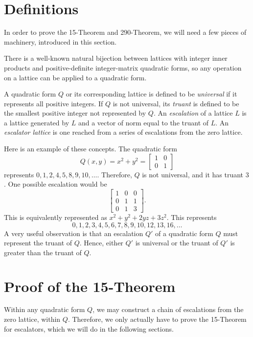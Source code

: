 \documentclass[letterpaper, 12pt]{article}
\begin{document}
\section{Definitions}
In order to prove the 15-Theorem and 290-Theorem, we will need a few pieces of machinery, introduced in this section.

There is a well-known natural bijection between lattices with integer inner products and positive-definite integer-matrix quadratic forms, so any operation on a lattice can be applied to a quadratic form.

A quadratic form $Q$ or its corresponding lattice is defined to be \emph{universal} if it represents all positive integers. If $Q$ is not universal, its \emph{truant} is defined to be the smallest positive integer not represented by $Q$. An \emph{escalation} of a lattice $L$ is a lattice generated by $L$ and a vector of norm equal to the truant of $L$. An \emph{escalator lattice} is one reached from a series of escalations from the zero lattice.

Here is an example of these concepts. The quadratic form
\[Q(x, y) = x^2 + y^2 = \begin{bmatrix} 1 & 0 \\ 0 & 1 \end{bmatrix}\]
represents $0, 1, 2, 4, 5, 8, 9, 10, \ldots$. Therefore, $Q$ is not universal, and it has truant $3$. One possible escalation would be
\[\begin{bmatrix} 1 & 0 & 0 \\ 0 & 1 & 1 \\ 0 & 1 & 3 \end{bmatrix}.\]
This is equivalently represented as $x^2 + y^2 + 2yz + 3z^2$. This represents
\[0, 1, 2, 3, 4, 5, 6, 7, 8, 9, 10, 12, 13, 16, \ldots\]
A very useful observation is that an escalation $Q'$ of a quadratic form $Q$ must represent the truant of $Q$. Hence, either $Q'$ is universal or the truant of $Q'$ is greater than the truant of $Q$.

\section{Proof of the 15-Theorem}
Within any quadratic form $Q$, we may construct a chain of escalations from the zero lattice, within $Q$. Therefore, we only actually have to prove the 15-Theorem for escalators, which we will do in the following sections.
\end{document}
